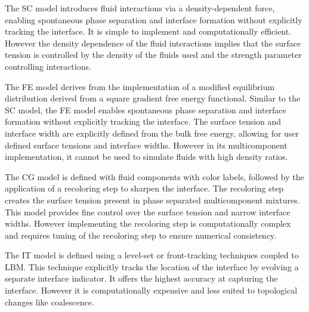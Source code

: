 The SC model introduces fluid interactions via a density-dependent force, enabling spontaneous phase separation 
and interface formation without explicitly tracking the interface. It is simple to implement and computationally efficient. However the density
dependence of the fluid interactions implies that the surface tension is controlled by the density of the fluids used and the strength parameter
controlling interactions.

The FE model derives from the implementation of a modified equilibrium distribution derived from a square gradient free energy functional. Similar to the
SC model, the FE model enables spontaneous phase separation and interface formation without explicitly tracking the interface. The surface tension and
interface width are explicitly defined from the bulk free energy, allowing for user defined surface tensions and interface widths. However in its multicomponent
implementation, it cannot be used to simulate fluids with high density ratios.

The CG model is defined with fluid components with color labels, followed by the application of a recoloring step to sharpen the interface. 
\cite{liu_multiphase_2016} The recoloring step creates the surface tension present in phase separated multicomponent mixtures. This model
provides fine control over the surface tension and narrow interface widths. However implementing the recoloring step is computationally complex 
and requires tuning of the recoloring step to ensure numerical consistency.  

The IT model is defined using a level-set or front-tracking techniques coupled to LBM. This technique explicitly tracks the location of the
interface by evolving a separate interface indicator. It offers the highest accuracy at capturing the interface. However it is computationally
expensive and less suited to topological changes like coalescence. 



